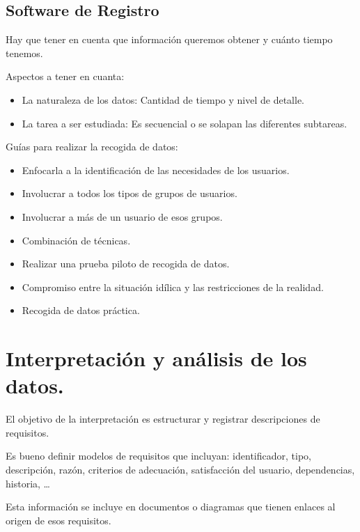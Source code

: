 \documentclass[12pt, twoside, openright]{report} %
\begin{document}
\subsection{Software de Registro}
\pagebreak
    Hay que tener en cuenta que información queremos obtener y cuánto
    tiempo tenemos.
  
    Aspectos a tener en cuanta:

    \begin{itemize}
    
    \item
      La naturaleza de los datos: Cantidad de tiempo y nivel de detalle.
    \item
      La tarea a ser estudiada: Es secuencial o se solapan las
      diferentes subtareas.
    \end{itemize}

    Guías para realizar la recogida de datos:

    \begin{itemize}
    
    \item
      Enfocarla a la identificación de las necesidades de los usuarios.
    \item
      Involucrar a todos los tipos de grupos de usuarios.
    \item
      Involucrar a más de un usuario de esos grupos.
    \item
      Combinación de técnicas.
    \item
      Realizar una prueba piloto de recogida de datos.
    \item
      Compromiso entre la situación idílica y las restricciones de la
      realidad.
    \item
      Recogida de datos práctica.
    \end{itemize}


  \section{Interpretación y análisis de los datos.}

    El objetivo de la interpretación es estructurar y registrar
    descripciones de requisitos.

    Es bueno definir modelos de requisitos que incluyan: identificador,
    tipo, descripción, razón, criterios de adecuación, satisfacción del
    usuario, dependencias, historia, \ldots{}

    Esta información se incluye en documentos o diagramas que tienen
    enlaces al origen de esos requisitos.
\end{document}
